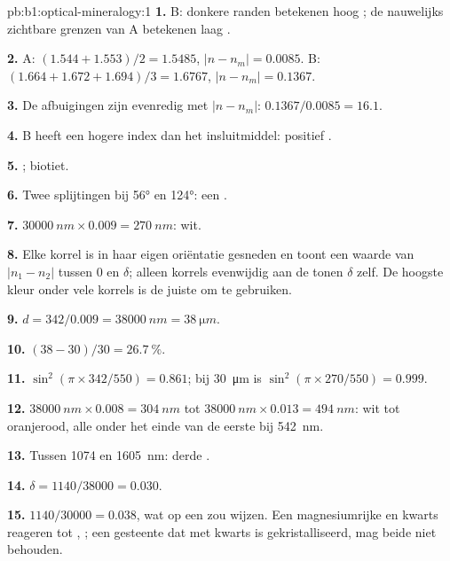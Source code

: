\begin{solution}{pb:b1:optical-mineralogy:1}
\textbf{1.} B: donkere randen betekenen hoog ; de nauwelijks zichtbare grenzen van A betekenen laag .

\textbf{2.} A: $(1.544 + 1.553)/2 = 1.5485$, $|n - n_m| = 0.0085$. B:
$(1.664 + 1.672 + 1.694)/3 = 1.6767$, $|n - n_m| = 0.1367$.

\textbf{3.} De afbuigingen zijn evenredig met $|n - n_m|$: $0.1367/0.0085 =
16.1$.

\textbf{4.} B heeft een hogere index dan het insluitmiddel: positief .

\textbf{5.} ; biotiet.

\textbf{6.} Twee splijtingen bij \ang{56} en \ang{124}: een .

\textbf{7.} $\qty{30000}{nm}\times0.009 = \qty{270}{nm}$:  wit.

\textbf{8.} Elke korrel is in haar eigen oriëntatie gesneden en toont een waarde van $|n_1 - n_2|$ tussen 0 en
$\delta$; alleen korrels evenwijdig aan de  tonen $\delta$ zelf. De hoogste kleur onder vele korrels is
de juiste om te gebruiken.

\textbf{9.} $d = 342/0.009 = \qty{38000}{nm} = \qty{38}{\micro m}$.

\textbf{10.} $(38 - 30)/30 = \qty{26.7}{\percent}$.

\textbf{11.} $\sin^2(\pi\times342/550) = 0.861$; bij \qty{30}{\micro m} is
$\sin^2(\pi\times270/550) = 0.999$.

\textbf{12.} $\qty{38000}{nm}\times0.008 = \qty{304}{nm}$ tot
$\qty{38000}{nm}\times0.013 = \qty{494}{nm}$: wit tot oranjerood, alle onder het einde van de eerste  bij \qty{542}{nm}.

\textbf{13.} Tussen 1074 en \qty{1605}{nm}: derde .

\textbf{14.} $\delta = 1140/38000 = 0.030$.

\textbf{15.} $1140/30000 = 0.038$, wat op een  zou wijzen. Een magnesiumrijke  en kwarts reageren tot ,
; een gesteente dat met kwarts is gekristalliseerd, mag beide niet behouden.


\end{solution}
